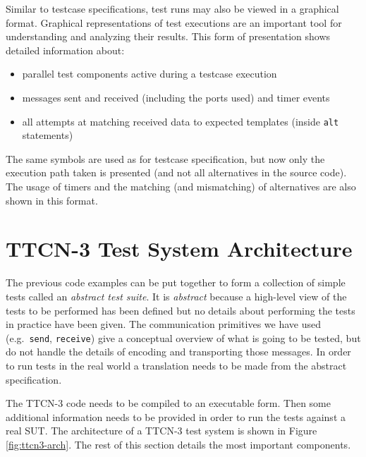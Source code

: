 Similar to testcase specifications,
test runs may also be viewed in a graphical format.
Graphical representations of test executions
are an important tool for understanding and analyzing their results.
This form of presentation shows detailed information about:
\begin{itemize}
\item parallel test components active during a testcase execution
\item messages sent and received (including the ports used) and timer events
\item all attempts at matching received data to expected templates
(inside \verb=alt= statements)
\end{itemize}

The same symbols are used as for testcase specification,
but now only the execution path taken is presented
(and not all alternatives in the source code).
The usage of timers and the matching (and mismatching) of alternatives
are also shown in this format.



\section{TTCN-3 Test System Architecture}
\label{sec:test-system-arch}

The previous code examples can be put together
to form a collection of simple tests
called an \emph{abstract test suite}.
It is \emph{abstract}
because a high-level view of the tests to be performed has been defined
but no details about performing the tests in practice have been given.
The communication primitives we have used (e.g.\ \verb=send=, \verb=receive=)
give a conceptual overview of what is going to be tested,
but do not handle the details of encoding and transporting those messages.
In order to run tests in the real world
a translation needs to be made from the abstract specification.

The \ac{TTCN-3} code needs to be compiled to an executable form.
Then some additional information needs to be provided in order to run the tests
against a real \ac{SUT}.
The architecture of a \ac{TTCN-3} test system is shown
in Figure \ref{fig:ttcn3-arch}.
The rest of this section details the most important components.

